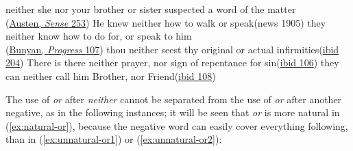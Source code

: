 \ea \label{ex:10no-nor}
neither she nor your brother or sister suspected a word of the matter\\\hfill(\href{https://archive.org/details/sensesensibility00austrich/page/226/mode/2up?q=%22neither+she+nor+your%22&view=theater}{Austen, \textit{Sense} 253})
\ex \label{ex:10no-nor2}
He knew neither how to walk or speak\hfill(news 1905) 
\ex \label{ex:10no-nor3}
\ea
they neither know how to do for, or speak to him\\\hfill(\href{https://archive.org/details/bunyanspilgrims00moffgoog/page/104/mode/2up?q=%22neither+know+how%22&view=theater}{Bunyan, \textit{Progress} 107})
\ex
thou neither seest thy original or actual infirmities\hfill(\href{https://archive.org/details/bunyanspilgrims00moffgoog/page/192/mode/2up?q=%22neither+seest+thy+original%22&view=theater}{ibid 204}) %
\z
\ex \label{ex:10no-nor4}
\ea
There is there neither prayer, nor sign of repentance for sin\hfill(\href{https://archive.org/details/bunyanspilgrims00moffgoog/page/104/mode/2up?q=%22there+neither+Prayer%22&view=theater}{ibid 106}) 
\ex
they can neither call him Brother, nor Friend\hfill(\href{https://archive.org/details/bunyanspilgrims00moffgoog/page/104/mode/2up?q=%22can+neither+call+him%22&view=theater}{ibid 108}) %
\z \z


The use of \textit{or} after \textit{neither} cannot be separated from the use of \textit{or} after another negative, as in the following instances; it will be seen that \textit{or} is more natural in (\ref{ex:natural-or}), because the negative word can easily cover everything following, than in (\ref{ex:unnatural-or1}) or (\ref{ex:unnatural-or2}):

